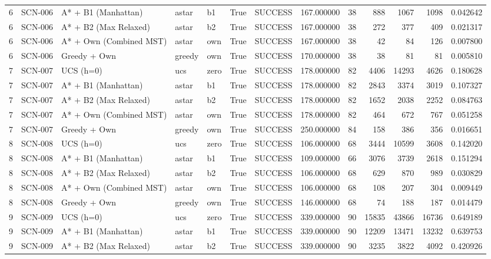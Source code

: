 \begin{table}[htbp]
\begin{tabular}{rllllrlrrrrrr}
6 & SCN-006 & A* + B1 (Manhattan) & astar & b1 & True & SUCCESS & 167.000000 & 38 & 888 & 1067 & 1098 & 0.042642 \\
6 & SCN-006 & A* + B2 (Max Relaxed) & astar & b2 & True & SUCCESS & 167.000000 & 38 & 272 & 377 & 409 & 0.021317 \\
6 & SCN-006 & A* + Own (Combined MST) & astar & own & True & SUCCESS & 167.000000 & 38 & 42 & 84 & 126 & 0.007800 \\
6 & SCN-006 & Greedy + Own & greedy & own & True & SUCCESS & 170.000000 & 38 & 38 & 81 & 81 & 0.005810 \\
7 & SCN-007 & UCS (h=0) & ucs & zero & True & SUCCESS & 178.000000 & 82 & 4406 & 14293 & 4626 & 0.180628 \\
7 & SCN-007 & A* + B1 (Manhattan) & astar & b1 & True & SUCCESS & 178.000000 & 82 & 2843 & 3374 & 3019 & 0.107327 \\
7 & SCN-007 & A* + B2 (Max Relaxed) & astar & b2 & True & SUCCESS & 178.000000 & 82 & 1652 & 2038 & 2252 & 0.084763 \\
7 & SCN-007 & A* + Own (Combined MST) & astar & own & True & SUCCESS & 178.000000 & 82 & 464 & 672 & 767 & 0.051258 \\
7 & SCN-007 & Greedy + Own & greedy & own & True & SUCCESS & 250.000000 & 84 & 158 & 386 & 356 & 0.016651 \\
8 & SCN-008 & UCS (h=0) & ucs & zero & True & SUCCESS & 106.000000 & 68 & 3444 & 10599 & 3608 & 0.142020 \\
8 & SCN-008 & A* + B1 (Manhattan) & astar & b1 & True & SUCCESS & 109.000000 & 66 & 3076 & 3739 & 2618 & 0.151294 \\
8 & SCN-008 & A* + B2 (Max Relaxed) & astar & b2 & True & SUCCESS & 106.000000 & 68 & 629 & 870 & 989 & 0.030829 \\
8 & SCN-008 & A* + Own (Combined MST) & astar & own & True & SUCCESS & 106.000000 & 68 & 108 & 207 & 304 & 0.009449 \\
8 & SCN-008 & Greedy + Own & greedy & own & True & SUCCESS & 146.000000 & 68 & 74 & 188 & 187 & 0.014479 \\
9 & SCN-009 & UCS (h=0) & ucs & zero & True & SUCCESS & 339.000000 & 90 & 15835 & 43866 & 16736 & 0.649189 \\
9 & SCN-009 & A* + B1 (Manhattan) & astar & b1 & True & SUCCESS & 339.000000 & 90 & 12209 & 13471 & 13232 & 0.639753 \\
9 & SCN-009 & A* + B2 (Max Relaxed) & astar & b2 & True & SUCCESS & 339.000000 & 90 & 3235 & 3822 & 4092 & 0.420926 \\

\end{tabular}
\end{table}
